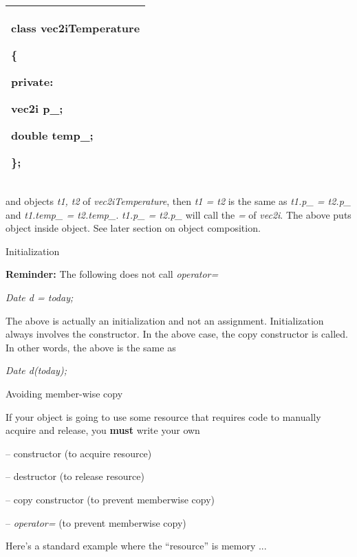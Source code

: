 \documentclass[
]{article}
\begin{document}
\begin{longtable}[]{@{}l@{}}
\toprule
\endhead
\begin{minipage}[t]{0.97\columnwidth}\raggedright
class vec2iTemperature

\{

private:

vec2i p\_;

double temp\_;

\};\strut
\end{minipage}\tabularnewline
\bottomrule
\end{longtable}

and objects \emph{t1, t2} of \emph{vec2iTemperature}, then \emph{t1 =
t2} is the same as \emph{t1.p\_ = t2.p\_} and \emph{t1.temp\_ =
t2.temp\_}. \emph{t1.p\_ = t2.p\_} will call the \emph{=} of
\emph{vec2i}. The above puts object inside object. See later section on
object composition.

Initialization

\textbf{Reminder:} The following does not call \emph{operator=}

\emph{Date d = today;}

The above is actually an initialization and not an assignment.
Initialization always involves the constructor. In the above case, the
copy constructor is called. In other words, the above is the same as

\emph{Date d(today);}

Avoiding member-wise copy

If your object is going to use some resource that requires code to
manually acquire and release, you \textbf{must} write your own

-- constructor (to acquire resource)

-- destructor (to release resource)

-- copy constructor (to prevent memberwise copy)

-- \emph{operator=} (to prevent memberwise copy)

Here's a standard example where the ``resource'' is memory ...
\end{document}
